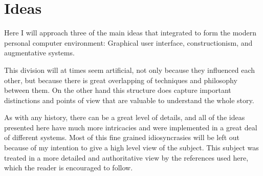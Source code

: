 \section{Ideas}

Here I will approach three of the main ideas that integrated to form
the modern personal computer environment: Graphical user interface,
constructionism, and augmentative systems. \cite{smalltalk:kay_alan__early_history_smalltalk}

This division will at times seem artificial, not only because they
influenced each other, but because there is great overlapping of
techniques and philosophy between them. On the other hand this
structure does capture important distinctions and points of view that
are valuable to understand the whole story.

As with any history, there can be a great level of details, and all of
the ideas presented here have much more intricacies and were
implemented in a great deal of different systems. Most of this fine
grained idiosyncrasies will be left out because of my intention to
give a high level view of the subject. This subject was treated in a
more detailed and authoritative view by the references used here,
which the reader is encouraged to follow.






